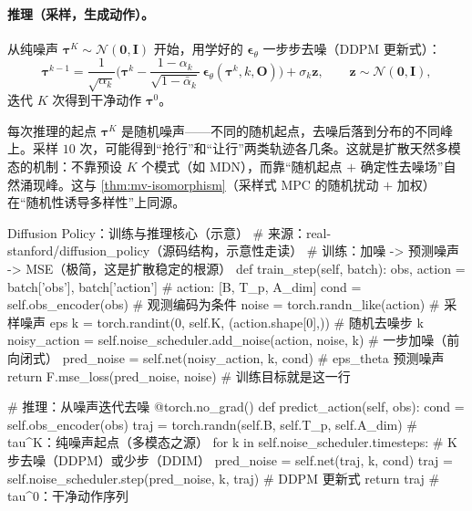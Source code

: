 \paragraph{推理（采样，生成动作）。}
从纯噪声 $\boldsymbol{\tau}^K\sim\mathcal{N}(\mathbf{0},\mathbf{I})$ 开始，用学好的 $\boldsymbol{\epsilon}_\theta$ 一步步去噪（DDPM 更新式）：
\begin{equation}
  \boldsymbol{\tau}^{k-1}=\frac{1}{\sqrt{\alpha_k}}\Big(\boldsymbol{\tau}^k-\frac{1-\alpha_k}{\sqrt{1-\bar\alpha_k}}\,\boldsymbol{\epsilon}_\theta(\boldsymbol{\tau}^k,k,\mathbf{O})\Big)+\sigma_k\mathbf{z},\qquad \mathbf{z}\sim\mathcal{N}(\mathbf{0},\mathbf{I}),
  \label{eq:de-reverse}
\end{equation}
迭代 $K$ 次得到干净动作 $\boldsymbol{\tau}^0$。

\begin{insight}
每次推理的起点 $\boldsymbol{\tau}^K$ 是随机噪声——不同的随机起点，去噪后落到分布的不同峰上。采样 $10$ 次，可能得到“抢行”和“让行”两类轨迹各几条。这就是扩散天然多模态的机制：不靠预设 $K$ 个模式（如 MDN），而靠“随机起点 $+$ 确定性去噪场”自然涌现峰。这与 \cref{thm:mv-isomorphism}（采样式 MPC 的随机扰动 $+$ 加权）在“随机性诱导多样性”上同源。
\end{insight}

\begin{codebox}[Python]{Diffusion Policy：训练与推理核心（示意）}
# 来源：real-stanford/diffusion_policy（源码结构，示意性走读）
# 训练：加噪 -> 预测噪声 -> MSE（极简，这是扩散稳定的根源）
def train_step(self, batch):
    obs, action = batch['obs'], batch['action']      # action: [B, T_p, A_dim]
    cond = self.obs_encoder(obs)                     # 观测编码为条件
    noise = torch.randn_like(action)                 # 采样噪声 eps
    k = torch.randint(0, self.K, (action.shape[0],)) # 随机去噪步 k
    noisy_action = self.noise_scheduler.add_noise(action, noise, k)  # 一步加噪（前向闭式）
    pred_noise = self.net(noisy_action, k, cond)     # eps_theta 预测噪声
    return F.mse_loss(pred_noise, noise)             # 训练目标就是这一行

# 推理：从噪声迭代去噪
@torch.no_grad()
def predict_action(self, obs):
    cond = self.obs_encoder(obs)
    traj = torch.randn(self.B, self.T_p, self.A_dim) # tau^K：纯噪声起点（多模态之源）
    for k in self.noise_scheduler.timesteps:         # K 步去噪（DDPM）或少步（DDIM）
        pred_noise = self.net(traj, k, cond)
        traj = self.noise_scheduler.step(pred_noise, k, traj)   # DDPM 更新式
    return traj                                      # tau^0：干净动作序列
\end{codebox}

